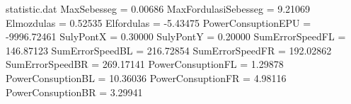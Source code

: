 \begin{filecontents*}{statistic.dat}
MaxSebesseg =    0.00686
MaxFordulasiSebesseg =    9.21069
Elmozdulas =    0.52535
Elfordulas =   -5.43475
PowerConsuptionEPU = -9996.72461
SulyPontX =    0.30000
SulyPontY =    0.20000
SumErrorSpeedFL = 146.87123
SumErrorSpeedBL =  216.72854
SumErrorSpeedFR = 192.02862
SumErrorSpeedBR = 269.17141
PowerConsuptionFL =   1.29878
PowerConsuptionBL =  10.36036
PowerConsuptionFR =   4.98116
PowerConsuptionBR =   3.29941
\end{filecontents*}
